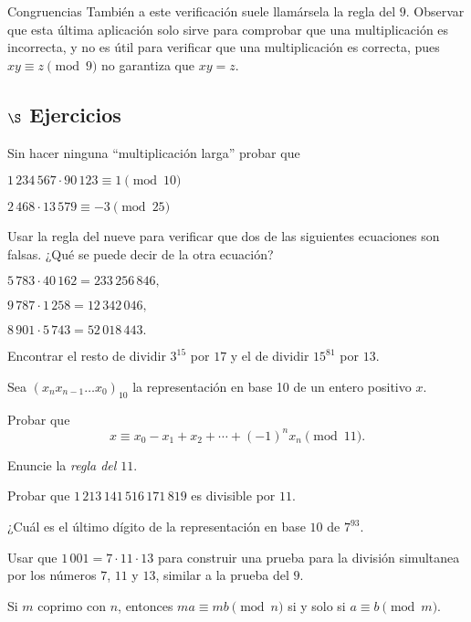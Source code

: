 \begin{section}{Congruencias}
También a este verificación suele llamársela la regla del $9$. Observar que esta última aplicación solo sirve para comprobar que una multiplicación es incorrecta, y no es útil para verificar que una multiplicación es correcta, pues $xy \equiv z \pmod{9}$ no garantiza que $xy=z$. 

\subsection*{$\S$ Ejercicios}

\begin{enumex}
\item Sin hacer ninguna ``multiplicación larga'' probar que
\begin{enumex}
    \item $1\,234\,567 \cdot 90\,123 \equiv 1 \pmod{10}$
    
    \item $2\,468 \cdot 13\,579 \equiv -3 \pmod{25}$
\end{enumex}

\item Usar la regla del nueve para verificar que dos de las siguientes ecuaciones son falsas. ¿Qué se puede decir de la otra ecuación?
\begin{enumex}
    \item  $5\,783 \cdot 40\,162  = 233\,256\,846 ,$
    
    \item  $9\,787 \cdot 1\,258  = 12\,342\,046 , $
    
    \item  $ 8\,901 \cdot 5\,743  = 52\,018\,443 .$
\end{enumex}

\item Encontrar el resto de dividir $3^{15}$ por $17$ y el de dividir $15^{81}$ por $13$.
\item  Sea $(x_nx_{n-1}\ldots x_0)_{10}$ la representación en base 10 de un entero positivo $x$. 
\begin{enumex}
    \item Probar que 
    $$
    x\equiv x_0-x_1+x_2+\cdots +(-1)^nx_n \pmod{11}.
    $$
    \item Enuncie la \textit{regla del $11$}.
    \item Probar que $1\,213\,141\,516\,171\,819$  es divisible por $11$.
\end{enumex}

\item ¿Cuál es el último dígito de la representación en base $10$ de
$7^{93}$.

\item Usar que $1\,001=7\cdot 11 \cdot 13$ para construir una prueba
para la división simultanea por los números $7$, $11$ y $13$, similar a la prueba
del $9$.


\item Si $m$ coprimo con $n$, entonces $ma\equiv mb \pmod{n}$ si y solo
si $a\equiv b\pmod{m}$.

\end{enumex}

\end{section}


